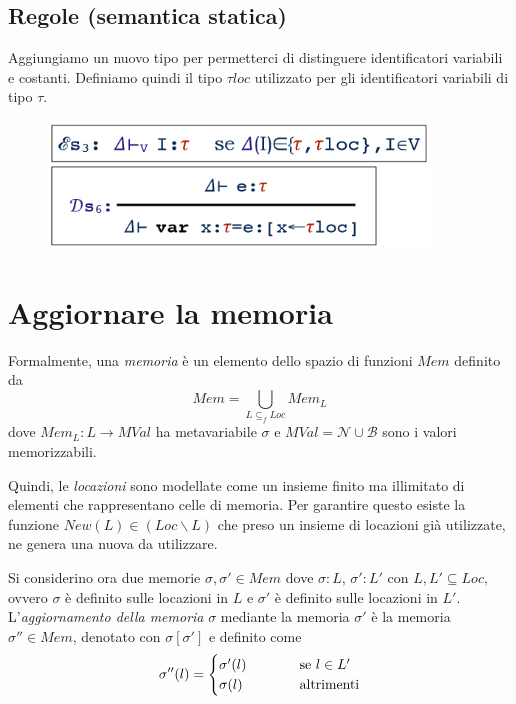 \documentclass[a4paper,oneside,titlepage]{book}
\begin{document}
\subsection{Regole (semantica statica)}
\label{sec:decSemStat2}
Aggiungiamo un nuovo tipo per permetterci di distinguere identificatori variabili e costanti. Definiamo quindi il tipo $\tau loc$ utilizzato per gli identificatori variabili di tipo $\tau$.
\begin{figure}[htp]
	\centering
	\includegraphics[width=0.9\textwidth]{varRegole.png}
\end{figure}

\section{Aggiornare la memoria}
Formalmente, una \textit{memoria} è un elemento dello spazio di funzioni $Mem$ definito da
\[ Mem=\bigcup\limits_{L \subseteq_f Loc} Mem_L \]
dove $Mem_L: L \rightarrow MVal$ ha metavariabile $\sigma$ e $MVal=\mathcal{N} \cup \mathcal{B}$ sono i valori memorizzabili.

Quindi, le \textit{locazioni} sono modellate come un insieme finito ma illimitato di elementi che rappresentano celle di memoria. Per garantire questo esiste la funzione $New(L) \in (Loc \smallsetminus L)$ che preso un insieme di locazioni già utilizzate, ne genera una nuova da utilizzare.

Si considerino ora due memorie $\sigma,\sigma' \in Mem$ dove $\sigma:L$, $\sigma':L'$ con $L,L' \subseteq Loc$, ovvero $\sigma$ è definito sulle locazioni in $L$ e $\sigma'$ è definito sulle locazioni in $L'$. L'\textit{aggiornamento della memoria} $\sigma$ mediante la memoria $\sigma'$ è la memoria $\sigma'' \in Mem$, denotato con $\sigma[\sigma']$ e definito come
\[
\sigma''(l) =
	\begin{cases}
	\sigma'(l)& \hspace{1.0cm} \text{se } l \in L' \\
	\sigma(l)& \hspace{1.0cm} \text{altrimenti}
	\end{cases}
\]
\end{document}
